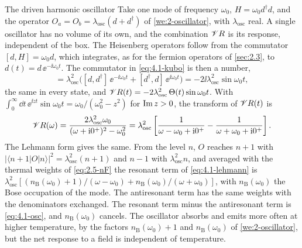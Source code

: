 \begin{workedexample}{The driven harmonic oscillator}\label{we:4-oscillator}
Take one mode of frequency $\omega_0$, $H = \omega_0 d^\dagger d$, and the operator $O_a = O_b = \lambda_{\mathrm{osc}}(d + d^\dagger)$ of \cref{we:2-oscillator}, with $\lambda_{\mathrm{osc}}$ real. A single oscillator has no volume of its own, and the combination $\mathscr{V} R$ is its response, independent of the box. The Heisenberg operators follow from the commutator $[d, H] = \omega_0 d$, which integrates, as for the fermion operators of \cref{sec:2.3}, to $d(t) = d\,\ee^{-\ii\omega_0t}$. The commutator in \cref{eq:4.1-kubo} is then a number,
\begin{equation*}
  [O(t), O] = \lambda_{\mathrm{osc}}^2\bigl([d, d^\dagger]\,\ee^{-\ii\omega_0t} + [d^\dagger, d]\,\ee^{\ii\omega_0t}\bigr) = -2\ii\lambda_{\mathrm{osc}}^2\sin\omega_0t ,
\end{equation*}
the same in every state, and $\mathscr{V} R(t) = -2\lambda_{\mathrm{osc}}^2\,\Theta(t)\sin\omega_0t$. With $\int_0^\infty\dd t\,\ee^{\ii zt}\sin\omega_0t = \omega_0/(\omega_0^2 - z^2)$ for $\operatorname{Im} z > 0$, the transform of $\mathscr{V} R(t)$ is
\begin{equation}
  \mathscr{V} R(\omega) = \frac{2\lambda_{\mathrm{osc}}^2\omega_0}{(\omega + \mathrm{i}0^+)^2 - \omega_0^2} = \lambda_{\mathrm{osc}}^2\left[\frac{1}{\omega - \omega_0 + \mathrm{i}0^+} - \frac{1}{\omega + \omega_0 + \mathrm{i}0^+}\right] .
  \label{eq:4.1-osc}
\end{equation}
The Lehmann form gives the same. From the level $n$, $O$ reaches $n + 1$ with $|\langle n+1|O|n\rangle|^2 = \lambda_{\mathrm{osc}}^2(n + 1)$ and $n - 1$ with $\lambda_{\mathrm{osc}}^2 n$, and averaged with the thermal weights of \cref{eq:2.5-nF} the resonant term of \cref{eq:4.1-lehmann} is $\lambda_{\mathrm{osc}}^2[(n_{\mathrm{B}}(\omega_0) + 1)/(\omega - \omega_0) + n_{\mathrm{B}}(\omega_0)/(\omega + \omega_0)]$, with $n_{\mathrm{B}}(\omega_0)$ the Bose occupation of the mode. The antiresonant term has the same weights with the denominators exchanged. The resonant term minus the antiresonant term is \cref{eq:4.1-osc}, and $n_{\mathrm{B}}(\omega_0)$ cancels. The oscillator absorbs and emits more often at higher temperature, by the factors $n_{\mathrm{B}}(\omega_0) + 1$ and $n_{\mathrm{B}}(\omega_0)$ of \cref{we:2-oscillator}, but the net response to a field is independent of temperature.


\end{workedexample}
